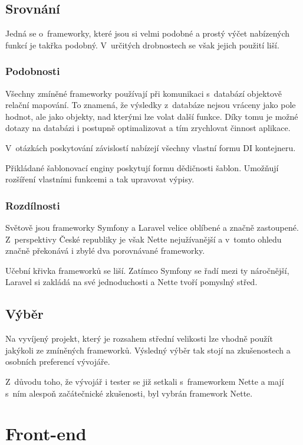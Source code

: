 \documentclass[czech,BP]{thesiskiv}
\begin{document}
	\subsection{Srovnání}
	\par Jedná se o~frameworky, které jsou si velmi podobné a prostý výčet nabízených funkcí je takřka podobný. V~určitých drobnostech se však jejich použití liší.
	\subsubsection{Podobnosti}
	\par Všechny zmíněné frameworky používají při komunikaci s~databází objektově relační mapování. To znamená, že výsledky z~databáze nejsou vráceny jako pole hodnot, ale jako objekty, nad kterými lze volat další funkce. Díky tomu je možné dotazy na databázi i postupně optimalizovat a tím zrychlovat činnost aplikace.
	\par V~otázkách poskytování závislostí nabízejí všechny vlastní formu DI kontejneru.
	\par Přikládané šablonovací enginy poskytují formu dědičnosti šablon. Umožňují rozšíření vlastními funkcemi a tak upravovat výpisy.
	\subsubsection{Rozdílnosti}
	\par Světově jsou frameworky Symfony a Laravel velice oblíbené a značně zastoupené. Z~perspektivy České republiky je však Nette nejužívanější a v~tomto ohledu značně překonává i zbylé dva porovnávané frameworky.
	\par Učební křivka frameworků se liší. Zatímco Symfony se řadí mezi ty náročnější, Laravel si zakládá na své jednoduchosti a Nette tvoří pomyslný střed.
	\subsection{Výběr}
	\par Na vyvíjený projekt, který je rozsahem střední velikosti lze vhodně použít jakýkoli ze zmíněných frameworků. Výsledný výběr tak stojí na zkušenostech a osobních preferencí vývojáře.
	\par Z~důvodu toho, že vývojář i tester se již setkali s~frameworkem Nette a mají s~ním alespoň začátečnické zkušenosti, byl vybrán framework Nette.
\section{Front-end}
\end{document}
